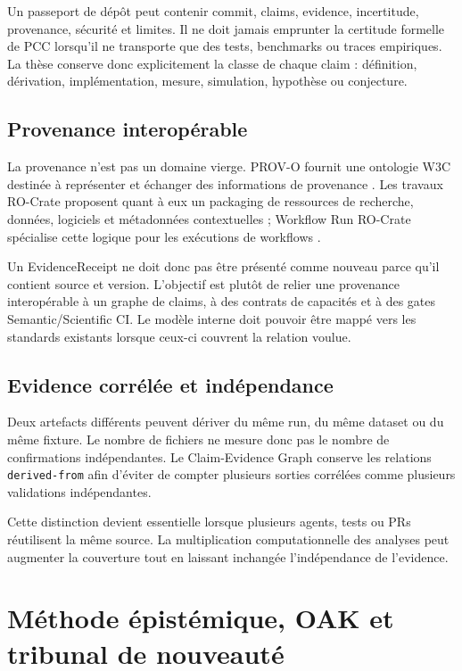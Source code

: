 Un passeport de dépôt peut contenir commit, claims, evidence, incertitude, provenance, sécurité et limites. Il ne doit jamais emprunter la certitude formelle de PCC lorsqu'il ne transporte que des tests, benchmarks ou traces empiriques. La thèse conserve donc explicitement la classe de chaque claim : définition, dérivation, implémentation, mesure, simulation, hypothèse ou conjecture.

\section{Provenance interopérable}

La provenance n'est pas un domaine vierge. PROV-O fournit une ontologie W3C destinée à représenter et échanger des informations de provenance \cite{lebo2013provo}. Les travaux RO-Crate proposent quant à eux un packaging de ressources de recherche, données, logiciels et métadonnées contextuelles \cite{soilandreyes2021rocrate}; Workflow Run RO-Crate spécialise cette logique pour les exécutions de workflows \cite{leo2023workflowrunrocrate}.

Un EvidenceReceipt ne doit donc pas être présenté comme nouveau parce qu'il contient source et version. L'objectif est plutôt de relier une provenance interopérable à un graphe de claims, à des contrats de capacités et à des gates Semantic/Scientific CI. Le modèle interne doit pouvoir être mappé vers les standards existants lorsque ceux-ci couvrent la relation voulue.

\section{Evidence corrélée et indépendance}

Deux artefacts différents peuvent dériver du même run, du même dataset ou du même fixture. Le nombre de fichiers ne mesure donc pas le nombre de confirmations indépendantes. Le Claim-Evidence Graph conserve les relations \texttt{derived-from} afin d'éviter de compter plusieurs sorties corrélées comme plusieurs validations indépendantes.

Cette distinction devient essentielle lorsque plusieurs agents, tests ou PRs réutilisent la même source. La multiplication computationnelle des analyses peut augmenter la couverture tout en laissant inchangée l'indépendance de l'evidence.

\chapter{Méthode épistémique, OAK et tribunal de nouveauté}

